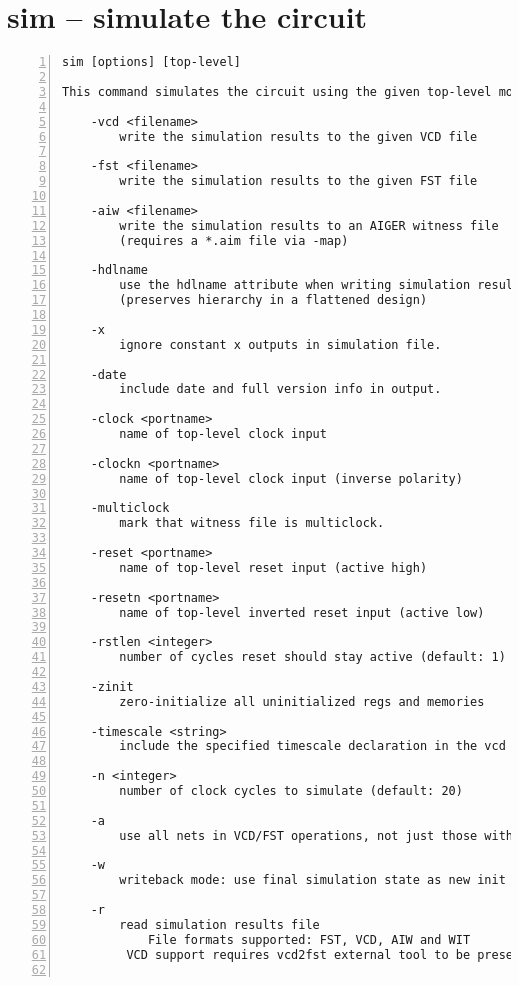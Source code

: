\section{sim -- simulate the circuit}
\label{cmd:sim}
\begin{lstlisting}[numbers=left,frame=single]
    sim [options] [top-level]

This command simulates the circuit using the given top-level module.

    -vcd <filename>
        write the simulation results to the given VCD file

    -fst <filename>
        write the simulation results to the given FST file

    -aiw <filename>
        write the simulation results to an AIGER witness file
        (requires a *.aim file via -map)

    -hdlname
        use the hdlname attribute when writing simulation results
        (preserves hierarchy in a flattened design)

    -x
        ignore constant x outputs in simulation file.

    -date
        include date and full version info in output.

    -clock <portname>
        name of top-level clock input

    -clockn <portname>
        name of top-level clock input (inverse polarity)

    -multiclock
        mark that witness file is multiclock.

    -reset <portname>
        name of top-level reset input (active high)

    -resetn <portname>
        name of top-level inverted reset input (active low)

    -rstlen <integer>
        number of cycles reset should stay active (default: 1)

    -zinit
        zero-initialize all uninitialized regs and memories

    -timescale <string>
        include the specified timescale declaration in the vcd

    -n <integer>
        number of clock cycles to simulate (default: 20)

    -a
        use all nets in VCD/FST operations, not just those with public names

    -w
        writeback mode: use final simulation state as new init state

    -r
        read simulation results file
            File formats supported: FST, VCD, AIW and WIT
		 VCD support requires vcd2fst external tool to be present


\end{lstlisting}
